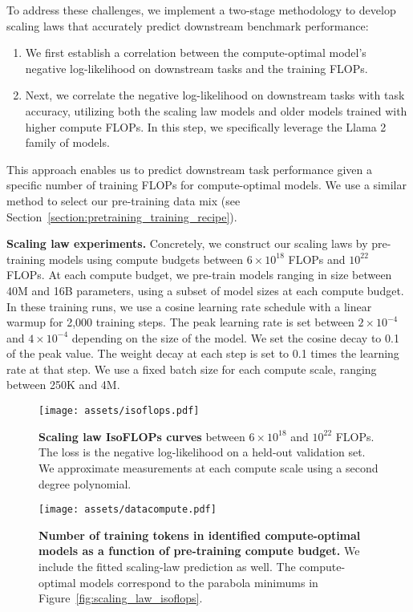 To address these challenges, we implement a two-stage methodology to develop scaling laws that accurately predict downstream benchmark performance:
\begin{enumerate}
    \item We first establish a correlation between the compute-optimal model's negative log-likelihood on downstream tasks and the training FLOPs.
    \item Next, we correlate the negative log-likelihood on downstream tasks with task accuracy, utilizing both the scaling law models and older models trained with higher compute FLOPs. In this step, we specifically leverage the Llama 2 family of models.
\end{enumerate}
This approach enables us to predict downstream task performance given a specific number of training FLOPs for compute-optimal models.
We use a similar method to select our pre-training data mix (see Section~\ref{section:pretraining_training_recipe}).


\textbf{Scaling law experiments.}
Concretely, we construct our scaling laws by pre-training models using compute budgets between $6 \times 10^{18}$ FLOPs and $10^{22}$ FLOPs.
At each compute budget, we pre-train models ranging in size between 40M and 16B parameters, using a subset of model sizes at each compute budget.
In these training runs, we use a cosine learning rate schedule with a linear warmup for 2,000 training steps.
The peak learning rate is set between $2 \times 10^{-4}$ and $4 \times 10^{-4}$ depending on the size of the model.
We set the cosine decay to 0.1 of the peak value.
The weight decay at each step is set to 0.1 times the learning rate at that step.
We use a fixed batch size for each compute scale, ranging between 250K and 4M.


\begin{figure}[tbp]
	\centering
	\begin{minipage}{0.45\textwidth}
		\centering
		\texttt{[image: assets/isoflops.pdf]}
		\caption{\textbf{Scaling law IsoFLOPs curves} between $6 \times 10^{18}$ and $10^{22}$ FLOPs. The loss is the negative log-likelihood on a held-out validation set. We approximate measurements at each compute scale using a second degree polynomial.}
		\label{fig:scaling_law_isoflops}
	\end{minipage}\hfill%
	\begin{minipage}{0.45\textwidth}
		\centering
		\texttt{[image: assets/datacompute.pdf]}
		\caption{\textbf{Number of training tokens in identified compute-optimal models as a function of pre-training compute budget.} We include the fitted scaling-law prediction as well. The compute-optimal models correspond to the parabola minimums in Figure~\ref{fig:scaling_law_isoflops}.}
		\label{fig:data_compute_scaling_law_fit}
	\end{minipage}
\end{figure}

